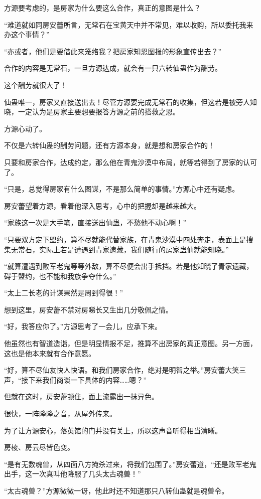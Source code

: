 \begin{this_body}
方源要考虑的，是房家为什么要这么合作，真正的意图是什么？

“难道就如同房安蕾所言，无常石在宝黄天中并不常见，难以收购，所以委托我来办这个事情？”

“亦或者，他们是要借此来笼络我？把房家知恩图报的形象宣传出去？”

合作的内容是无常石，一旦方源达成，就会有一只六转仙蛊作为酬劳。

这个酬劳就很大了！

仙蛊唯一，房家又直接送出去！尽管方源要完成无常石的收集，但这若是被旁人知晓，一定认为是房家主要想要报答方源之前的搭救之恩。

方源心动了。

不仅是六转仙蛊的酬劳问题，还有方源本身，就是想和房家合作的！

只要和房家合作，达成约定，那么他在青鬼沙漠中布局，就等若得到了房家的认可了。

“只是，总觉得房家有什么图谋，不是那么简单的事情。”方源心中还有疑虑。

房安蕾望着方源，看着他深入思考，心中的把握却是越来越大。

“家族这一次是大手笔，直接送出仙蛊，不愁他不动心啊！”

“只要双方定下盟约，算不尽就能代替家族，在青鬼沙漠中四处奔走，表面上是搜集无常石，实际上若是遭遇到青家遗藏，我们随行的房家蛊仙就能知晓。”

“就算遭遇到败军老鬼等等外敌，算不尽便会出手抵挡。若是他知晓了青家遗藏，碍于盟约，也不能和我族争夺什么。”

“太上二长老的计谋果然是周到得很！”

想到这里，房安蕾不禁对房睇长又生出几分敬佩之情。

“好，我答应你了。”方源思考了一会儿，应承下来。

他虽然也有智道造诣，但是明显情报不足，推算不出房家的真正意图。另一方面，这也是他本来就有合作意愿。

“好，算不尽仙友快人快语。和我们房家合作，绝对是明智之举。”房安蕾大笑三声，“接下来我们商谈一下具体的内容……嗯？”

但就在这时，房安蕾顿住，面上流露出一抹异色。

很快，一阵隆隆之音，从屋外传来。

为了让方源安心，落英馆的门并没有关上，所以这声音听得相当清晰。

房棱、房云尽皆色变。

“是有无数魂兽，从四面八方掩杀过来，将我们包围了。”房安蕾道，“还是败军老鬼出手，这一次真叫他降服了几头太古魂兽！”

“太古魂兽？”方源微微一讶，他此时还不知道那只八转仙蛊就是魂兽令。


\end{this_body}
